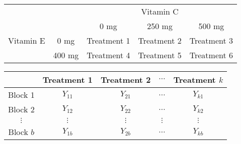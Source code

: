 \documentclass[a4paper,10pt]{article}
\title{}
\author{}
\begin{document}
\maketitle

\begin{abstract}

\end{abstract}

\section{}

\begin{table}
 \begin{tabular}{rc|ccc}
  \multicolumn{2}{c}{} & \multicolumn{3}{c}{Vitamin C} \\
  \multicolumn{2}{c}{} & 0 mg & 250 mg & 500 mg \\
  \hline
  Vitamin E & 0 mg & Treatment 1 & Treatment 2 & Treatment 3 \\
            & 400 mg & Treatment 4 & Treatment 5 & Treatment 6 \\
  \hline
 \end{tabular}

\end{table}



\begin{table}
 \begin{tabular}{c|cccc}
  \hline
    & Treatment 1 & Treatment 2 & $\cdots$ & Treatment $k$ \\
  \hline
  Block 1 & $Y_{11}$ & $Y_{21}$ & $\ldots$ & $Y_{k1}$ \\
  Block 2 & $Y_{12}$ & $Y_{22}$ & $\ldots$ & $Y_{k2}$ \\
 $\vdots$ & $\vdots$ & $\vdots$ & $\vdots$ & $\vdots$ \\
 Block $b$& $Y_{1b}$ & $Y_{2b}$ & $\ldots$ & $Y_{kb}$ \\
 \hline
 \end{tabular}

\end{table}
\end{document}
